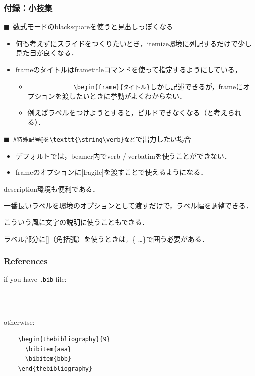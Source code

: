 \documentclass[unicode, 9pt, aspectratio=169]{beamer}
\begin{document}
  \begin{frame}[fragile]
    \frametitle{付録：小技集}
    \(\blacksquare \)\  数式モードのblacksquareを使うと見出しっぽくなる
    \begin{itemize}
      \item 何も考えずにスライドをつくりたいとき，itemize環境に列記するだけで少し見た目が良くなる．
      \item frameのタイトルはframetitleコマンドを使って指定するようにしている，
        \begin{itemize}
          \item
            \lstinline|
            \begin{frame}{タイトル}|しかし記述できるが，frameにオプションを渡したいときに挙動がよくわからない．
            \item 例えばラベルをつけようとすると，ビルドできなくなる（と考えられる）．
          \end{itemize}
      \end{itemize}

      \(\blacksquare \)\  \lstinline|#特殊記号@を\texttt{\string\verb}など|で出力したい場合
      \begin{itemize}
        \item デフォルトでは，beamer内でverb / verbatimを使うことができない．
        \item frameのオプションに[fragile]を渡すことで使えるようになる．
      \end{itemize}

      \begin{block}{}
        \begin{description}[ラベルの長さ]
          \item[ラベル] description環境も便利である．
          \item[ラベルの長さ] 一番長いラベルを環境のオプションとして渡すだけで，ラベル幅を調整できる．
          \item[{\(x \in [0, 1]\)}] こういう風に文字の説明に使うこともできる．
          \item[注意点] ラベル部分に[]（角括弧）を使うときは，\{ \dots \}で囲う必要がある．
        \end{description}
      \end{block}
    \end{frame}

    \begin{frame}[fragile]
      \frametitle{References}
      if you have \texttt{.bib} file:
    \begin{lstlisting}
      
      
    \end{lstlisting}

      otherwise:
    \begin{lstlisting}
    \begin{thebibliography}{9}
      \bibitem{aaa}
      \bibitem{bbb}
    \end{thebibliography}
    \end{lstlisting}

    \end{frame}
    
\end{document}

